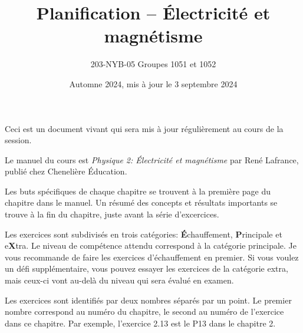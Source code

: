 \documentclass[10pt]{article}
\title{Planification -- Électricité et magnétisme}
\author{203-NYB-05  Groupes 1051 et 1052}
\date{Automne 2024, mis à jour le 3 septembre 2024}
\begin{document}
\makeatletter
\begin{center}
  {\LARGE \noindent\@title}
  \vspace{0.6em}

  {\large \noindent\@author}
  \vspace{0.2em}

  {\large \noindent\@date}
\end{center}
\vspace{2em}
\makeatother

\noindent Ceci est un document vivant qui sera mis à jour régulièrement au cours de la
session.

\vspace{1em}

\noindent Le manuel du cours est \emph{Physique 2: Électricité et magnétisme} par René
Lafrance, publié chez Chenelière Éducation.

\vspace{1em}

\noindent Les buts spécifiques de chaque chapitre se trouvent à la première
page du chapitre dans le manuel. Un résumé des concepts et résultats importants
se trouve à la fin du chapitre, juste avant la série d'excercices.

\vspace{1em}

\noindent Les exercices sont subdivisés en trois catégories:
\textbf{É}chauffement, \textbf{P}rincipale et e\textbf{X}tra. Le niveau de
compétence attendu correspond à la catégorie principale. Je vous recommande de
faire les exercices d'échauffement en premier. Si vous voulez un défi
supplémentaire, vous pouvez essayer les exercices de la catégorie extra, mais
ceux-ci vont au-delà du niveau qui sera évalué en examen.

\vspace{1em}

\noindent Les exercices sont identifiés par deux nombres séparés par un point.
Le premier nombre correspond au numéro du chapitre, le second au numéro de
l'exercice dans ce chapitre. Par exemple, l'exercice 2.13 est le P13 dans le
chapitre 2.
\end{document}
